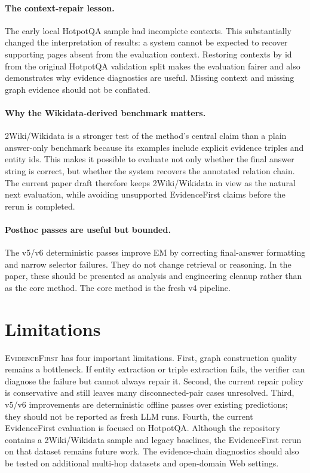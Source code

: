 \documentclass[runningheads]{llncs}
\newcommand{\sys}{\textsc{EvidenceFirst}\xspace}
\begin{document}
\paragraph{The context-repair lesson.}
The early local HotpotQA sample had incomplete contexts. This substantially
changed the interpretation of results: a system cannot be expected to recover
supporting pages absent from the evaluation context. Restoring contexts by id
from the original HotpotQA validation split makes the evaluation fairer and
also demonstrates why evidence diagnostics are useful. Missing context and
missing graph evidence should not be conflated.

\paragraph{Why the Wikidata-derived benchmark matters.}
2Wiki/Wikidata is a stronger test of the method's central claim than a plain
answer-only benchmark because its examples include explicit evidence triples
and entity ids. This makes it possible to evaluate not only whether the final
answer string is correct, but whether the system recovers the annotated
relation chain. The current paper draft therefore keeps 2Wiki/Wikidata in view
as the natural next evaluation, while avoiding unsupported EvidenceFirst claims
before the rerun is completed.

\paragraph{Posthoc passes are useful but bounded.}
The v5/v6 deterministic passes improve EM by correcting final-answer formatting
and narrow selector failures. They do not change retrieval or reasoning. In
the paper, these should be presented as analysis and engineering cleanup rather
than as the core method. The core method is the fresh v4 pipeline.

\section{Limitations}
\label{sec:limitations}

\sys has four important limitations. First, graph construction quality remains
a bottleneck. If entity extraction or triple extraction fails, the verifier can
diagnose the failure but cannot always repair it. Second, the current repair
policy is conservative and still leaves many disconnected-pair cases unresolved.
Third, v5/v6 improvements are deterministic offline passes over existing
predictions; they should not be reported as fresh LLM runs. Fourth, the current
EvidenceFirst evaluation is focused on HotpotQA. Although the repository
contains a 2Wiki/Wikidata sample and legacy baselines, the EvidenceFirst rerun
on that dataset remains future work. The evidence-chain diagnostics should also
be tested on additional multi-hop datasets and open-domain Web settings.
\end{document}
